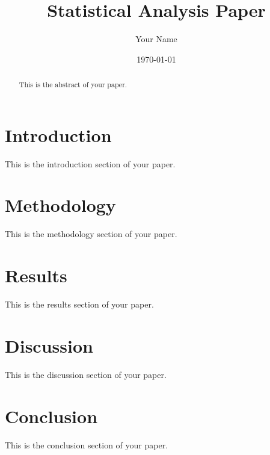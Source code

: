 \documentclass{article}
\title{Statistical Analysis Paper}
\author{Your Name}
\date{\today}
\begin{document}
\maketitle

\begin{abstract}
This is the abstract of your paper.
\end{abstract}

\section{Introduction}
This is the introduction section of your paper.

\section{Methodology}
This is the methodology section of your paper.

\section{Results}
This is the results section of your paper.

\section{Discussion}
This is the discussion section of your paper.

\section{Conclusion}
This is the conclusion section of your paper.
\end{document}
